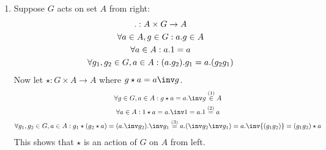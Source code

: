 \begin{enumerate}[label=]
    \item  
        Suppose $G$ acts on set $A$ from right:
        \begin{gather}
            .: A \times G \to A \notag \\
            \forall a \in A, g \in G: a.g \in A \\
            \forall a \in A: a.1 = a \\
            \forall g_1, g_2 \in G, a \in A: (a.g_2).g_1 = a.(g_2g_1)
        \end{gather}
        Now let $\star: G \times A \to A$ where $g\star a = a \inv g$.
        \begin{gather*}
           \forall g \in G, a \in A: g \star a = a.\inv g \overset{(1)}{\in} A \\
           \forall a \in A: 1 \star a = a.\inv 1 = a.1 \overset{(2)}{=} a \\
           \forall g_1, g_2 \in G, a \in A: g_1\star (g_2\star a) = (a.\inv g_2). \inv g_1 \overset{(3)}{= } a.(\inv g_2 \inv g_1) = a. \inv{(g_1 g_2)} = (g_1g_2) \star a 
        \end{gather*}
        This shows that $\star$ is an action of $G$ on $A$ from left.
\end{enumerate}